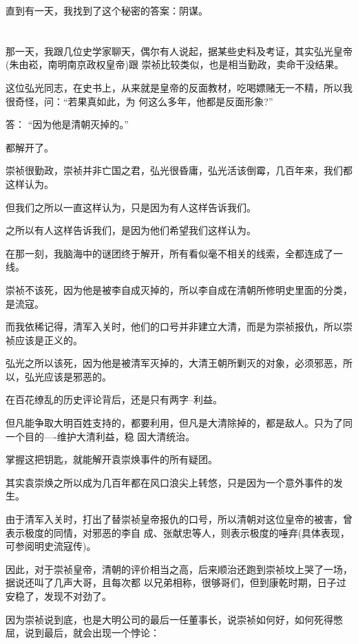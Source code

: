 \documentclass[11pt,a4paper,onecolumn]{article}
\begin{document}
直到有一天，我找到了这个秘密的答案：阴谋。

\section[\thesection]{}

那一天，我跟几位史学家聊天，偶尔有人说起，据某些史料及考证，其实弘光皇帝(朱由崧，南明南京政权皇帝)跟
崇祯比较类似，也是相当勤政，卖命干没结果。

这位弘光同志，在史书上，从来就是皇帝的反面教材，吃喝嫖赌无一不精，所以我很奇怪，问：``若果真如此，为
何这么多年，他都是反面形象?''

答： ``因为他是清朝灭掉的。''

都解开了。

崇祯很勤政，崇祯并非亡国之君，弘光很昏庸，弘光活该倒霉，几百年来，我们都这样认为。

但我们之所以一直这样认为，只是因为有人这样告诉我们。

之所以有人这样告诉我们，是因为他们希望我们这样认为。

在那一刻，我脑海中的谜团终于解开，所有看似毫不相关的线索，全都连成了一线。

崇祯不该死，因为他是被李自成灭掉的，所以李自成在清朝所修明史里面的分类，是流寇。

而我依稀记得，清军入关时，他们的口号并非建立大清，而是为崇祯报仇，所以崇祯应该是正义的。

弘光之所以该死，因为他是被清军灭掉的，大清王朝所剿灭的对象，必须邪恶，所以，弘光应该是邪恶的。

在百花缭乱的历史评论背后，还是只有两字--利益。

但凡能争取大明百姓支持的，都要利用，但凡是大清除掉的，都是敌人。只为了同一个目的----维护大清利益，稳
固大清统治。

掌握这把钥匙，就能解开袁崇焕事件的所有疑团。

其实袁崇焕之所以成为几百年都在风口浪尖上转悠，只是因为一个意外事件的发生。

由于清军入关时，打出了替崇祯皇帝报仇的口号，所以清朝对这位皇帝的被害，曾表示极度的同情，对邪恶的李自
成、张献忠等人，则表示极度的唾弃(具体表现，可参阅明史流寇传)。

因此，对于崇祯皇帝，清朝的评价相当之高，后来顺治还跑到崇祯坟上哭了一场，据说还叫了几声大哥，且每次都
以兄弟相称，很够哥们，但到康乾时期，日子过安稳了，发现不对劲了。

因为崇祯说到底，也是大明公司的最后一任董事长，说崇祯如何好，如何死得憋屈，说到最后，就会出现一个悖论：
\end{document}
